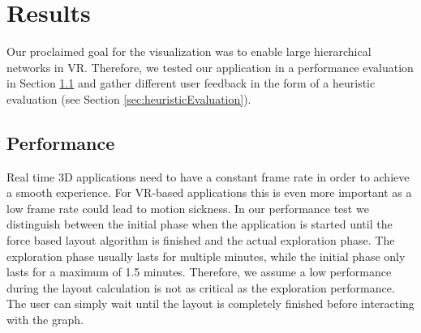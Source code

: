 \chapter{Results}

Our proclaimed goal for the visualization was to enable large hierarchical networks in VR. 
Therefore, we tested our application in a performance evaluation in Section \ref{sec:performanceEvaluation} and gather different user feedback in the form of a heuristic evaluation (see Section \ref{sec:heuristicEvaluation}).

\section{Performance}
\label{sec:performanceEvaluation}

Real time 3D applications need to have a constant frame rate in order to achieve a smooth experience.
For VR-based applications this is even more important as a low frame rate could lead to motion sickness. 
In our performance test we distinguish between the initial phase when the application is started until the force based layout algorithm is finished and the actual exploration phase. 
The exploration phase usually lasts for multiple minutes, while the initial phase only lasts for a maximum of 1.5 minutes.
Therefore, we assume a low performance during the layout calculation is not as critical as the exploration performance. 
The user can simply wait until the layout is completely finished before interacting with the graph.

